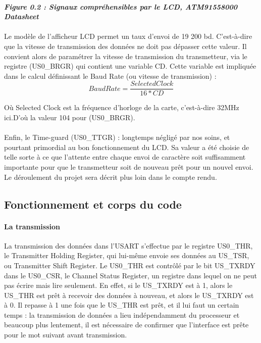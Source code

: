 \documentclass[a4paper]{report}
\begin{document}
					\paragraph{}
					\paragraph{\textit{Figure 0.2 : Signaux compréhensibles par le LCD, ATM91558000 Datasheet}}

				\paragraph{}
					Le modèle de l'afficheur LCD permet un taux d'envoi de 19 200 bd. C'est-à-dire que la vitesse de transmission des données ne doit pas dépasser cette valeur. Il convient alors de paramétrer la vitesse de transmission du transmetteur, via le registre (US0\_BRGR) qui contient une variable CD. Cette variable est impliquée dans le calcul définissant le Baud Rate (ou vitesse de transmission) :
					\begin{equation}
					Baud Rate = \frac{Selected Clock}{16 * CD}
					\end{equation}

					Où Selected Clock est la fréquence d'horloge de la carte, c'est-à-dire 32MHz ici.D'où la valeur 104 pour (US0\_BRGR).

				\paragraph{}
					Enfin, le Time-guard (US0\_TTGR) : longtemps négligé par nos soins, et pourtant primordial au bon fonctionnement du LCD. Sa valeur a été choisie de telle sorte à ce que l'attente entre chaque envoi de caractère soit suffisamment importante pour que le transmetteur soit de nouveau prêt pour un nouvel envoi. Le déroulement du projet sera décrit plus loin dans le compte rendu.
		\subsection{Fonctionnement et corps du code}
			\paragraph{La transmission}
				La transmission des données dans l'USART s'effectue par le registre US0\_THR, le Transmitter Holding Register, qui lui-même envoie ses données au US\_TSR, ou Transmitter Shift Register. Le US0\_THR est contrôlé par le bit US\_TXRDY dans le US0\_CSR, le Channel Status Register, un registre dans lequel on ne peut pas écrire mais lire seulement. En effet, si le US\_TXRDY est à 1, alors le US\_THR est prêt à recevoir des données à nouveau, et alors le US\_TXRDY est à 0. Il repasse à 1 une fois que le US\_THR est prêt, et il lui faut un certain temps :  la transmission de données a lieu indépendamment du processeur et beaucoup plus lentement, il est nécessaire de confirmer que l'interface est prête pour le mot suivant avant transmission.
\end{document}
